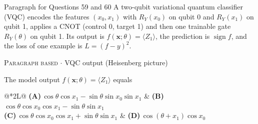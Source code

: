 \documentclass[11pt,a4paper]{article}
\newcommand{\optlabel}[1]{\textbf{(#1)}}
\newcommand{\correctlabel}[1]{\textcolor{okgreen}{\textbf{(#1)}\,\ding{51}}}
\newenvironment{qitem}[1]{\begin{list}{}{\setlength{\leftmargin}{3.3em}\setlength{\labelwidth}{3.1em}%
  \setlength{\labelsep}{0.2em}\setlength{\topsep}{3pt}\setlength{\parsep}{3pt}}\item[\textbf{Q.#1}\hfill]}{\end{list}}
\newcommand{\qmeta}[2]{{\footnotesize\color{black!60}\textsc{#1} \;$\cdot$\; #2}\par}
\begin{document}
\begin{passagebox}{Paragraph for Questions 59 and 60}
A two-qubit variational quantum classifier (VQC) encodes the features $(x_0, x_1)$ with $R_Y(x_0)$ on qubit 0 and
$R_Y(x_1)$ on qubit 1, applies a CNOT (control 0, target 1) and then one trainable gate $R_Y(\theta)$ on qubit 1. Its output
is $f(\mathbf x; \theta) = \langle Z_1\rangle$, the prediction is $\operatorname{sign} f$, and the loss of one example is $L = (f - y)^2$.
\begin{center}
\end{center}
\end{passagebox}
\begin{qitem}{59}
\qmeta{Paragraph based}{VQC output (Heisenberg picture)}
The model output $f(\mathbf x; \theta) = \langle Z_1\rangle$ equals
\par\smallskip\noindent\begin{tabularx}{\linewidth}{@{}*{2}{L}@{}}
\optlabel{A}\,$\cos\theta\cos x_1 - \sin\theta\sin x_0\sin x_1$ & \correctlabel{B}\,$\cos\theta\cos x_0\cos x_1 - \sin\theta\sin x_1$ \\[3pt]
\optlabel{C}\,$\cos\theta\cos x_0\cos x_1 + \sin\theta\sin x_1$ & \optlabel{D}\,$\cos(\theta + x_1)\cos x_0$
\end{tabularx}
\end{qitem}
\end{document}

